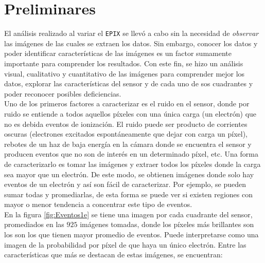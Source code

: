 \section{Preliminares}
El análisis realizado al variar el \verb|EPIX| se llevó a cabo sin la necesidad de \textit{observar} las imágenes de las cuales se extraen los datos. %
Sin embargo, conocer los datos y poder identificar características de las imágenes es un factor sumamente importante para comprender los resultados. Con este fin, se hizo un análisis visual, cualitativo y cuantitativo de las imágenes para comprender mejor los datos, explorar las características del sensor y de cada uno de sos cuadrantes y poder reconocer posibles deficiencias.\\
\indent Uno de los primeros factores a caracterizar es el ruido en el sensor, donde por ruido se entiende a todos aquellos píxeles con una única carga (un electrón) que no es debida eventos de ionización. El ruido puede ser producto de corrientes oscuras (electrones excitados espontáneamente que dejar con carga un píxel), rebotes de un haz de baja energía en la cámara donde se encuentra el sensor y producen eventos que no son de interés en un determinado píxel, etc. Una forma de caracterizarlo es tomar las imágenes y extraer todos los píxeles donde la carga sea mayor que un electrón. De este modo, se obtienen imágenes donde solo hay eventos de un electrón y así son fácil de caracterizar. Por ejemplo, se pueden sumar todas y promediarlas, de esta forma se puede ver si existen regiones con mayor o menor tendencia a concentrar este tipo de eventos.\\
\indent En la figura \ref{fig:Eventos1e} se tiene una imagen por cada cuadrante del sensor, promediados en las $925$ imágenes tomadas, donde los píxeles más brillantes son los son los que tienen mayor promedio de eventos. Puede interpretarse como una imagen de la probabilidad por píxel de que haya un único electrón. Entre las características que más se destacan de estas imágenes, se encuentran:
